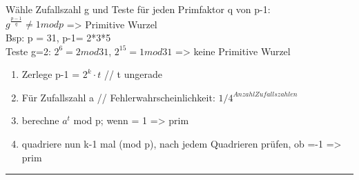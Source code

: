 Wähle Zufallszahl g und Teste für jeden Primfaktor q von p-1: \\
$g^{\frac{p-1}{q}} \neq 1 mod p$ => Primitive Wurzel\\
Bsp: p = 31, p-1= 2*3*5\\
Teste g=2:  $2^6 =2 mod 31$, $2^{15} =1 mod 31$ => keine Primitive Wurzel




\begin{enumerate}
\item Zerlege p-1 = $2^k \cdot t$ // t ungerade
\item Für Zufallszahl a // Fehlerwahrscheinlichkeit: $1/4^{Anzahl Zufallszahlen}$
\item berechne $a^t$ mod p; wenn = 1  => prim
\item quadriere nun k-1 mal (mod p), nach jedem Quadrieren prüfen, ob =-1 => prim
\end{enumerate}










\rule{\textwidth}{1pt}

\clearpage
